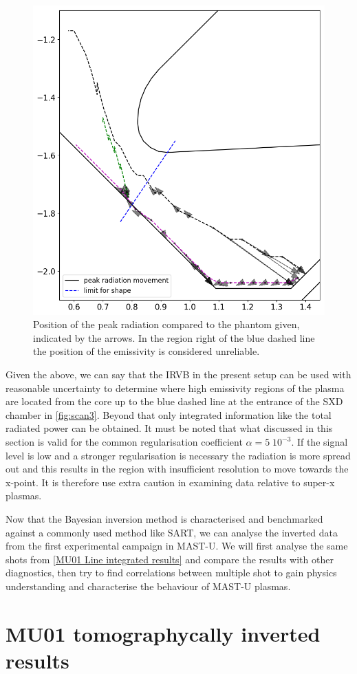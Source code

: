 \begin{figure}
	\centering
	\includegraphics[trim={0 0 0 0},clip,width=0.6\linewidth]{Chapters/chapter2/figs/radiation_movement.png}
	\caption{Position of the peak radiation compared to the phantom given, indicated by the arrows. In the region right of the blue dashed line the position of the emissivity is considered unreliable.}
	\label{fig:scan3}
\end{figure}

Given the above, we can say that the IRVB in the present setup can be used with reasonable uncertainty to determine where high emissivity regions of the plasma are located from the core up to the blue dashed line at the entrance of the SXD chamber in \autoref{fig:scan3}. Beyond that only integrated information like the total radiated power can be obtained.
It must be noted that what discussed in this section is valid for the common regularisation coefficient $\alpha=5 \; 10^{-3}$. If the signal level is low and a stronger regularisation is necessary the radiation is more spread out and this results in the region with insufficient resolution to move towards the x-point. It is therefore use extra caution in examining data relative to super-x plasmas.

Now that the Bayesian inversion method is characterised and benchmarked against a commonly used method like SART, we can analyse the inverted data from the first experimental campaign in MAST-U. We will first analyse the same shots from \autoref{MU01 Line integrated results} and compare the results with other diagnostics, then try to find correlations between multiple shot to gain physics understanding and characterise the behaviour of MAST-U plasmas.

\section{MU01 tomographycally inverted results}

